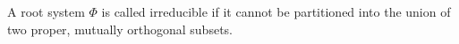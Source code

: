 A root system $\Phi$ is called irreducible if it cannot be partitioned into the union of two proper, mutually orthogonal subsets.
